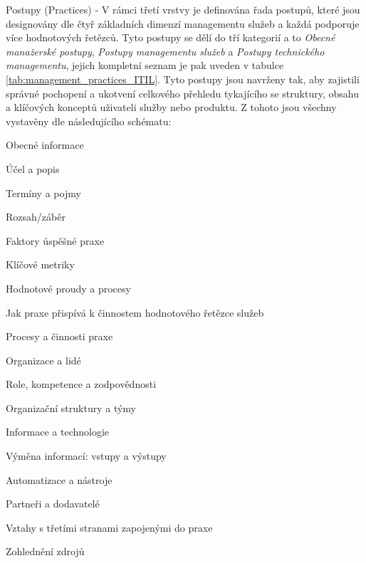 \documentclass[
  digital,     %
  twoside,     %
  lof,         %
  lot,         %
]{fithesis4}
\begin{document}
\begin{compactitem}
    \item Postupy (Practices) - V rámci třetí vrstvy je definována řada postupů, které jsou designovány dle čtyř základních dimenzí managementu služeb a každá podporuje více hodnotových řetězců. Tyto postupy se dělí do tří kategorií a to \emph{Obecné manažerské postupy}, \emph{Postupy managementu služeb} a \emph{Postupy technického managementu}, jejich kompletní seznam je pak uveden v tabulce \ref{tab:management_practices_ITIL}.
    Tyto postupy jsou navrženy tak, aby zajistili správné pochopení a ukotvení celkového přehledu tykajícího se struktury, obsahu a klíčových konceptů uživateli služby nebo produktu. Z tohoto jsou všechny vystavěny dle následujícího schématu: \parencite[s.~23]{Cartlidge2020}
    \begin{compactitem}
        \item Obecné informace
        \begin{compactitem}
            \item Účel a popis
            \item Termíny a pojmy
            \item Rozsah/záběr
            \item Faktory úspěšné praxe
            \item Klíčové metriky
        \end{compactitem}
        \item Hodnotové proudy a procesy
        \begin{compactitem}
            \item Jak praxe přispívá k činnostem hodnotového řetězce služeb
            \item Procesy a činnosti praxe
        \end{compactitem}
        \item Organizace a lidé
            \begin{compactitem}
                \item Role, kompetence a zodpovědnosti
                \item Organizační struktury a týmy
            \end{compactitem}
        \item Informace a technologie
        \begin{compactitem}
            \item Výměna informací: vstupy a výstupy
            \item Automatizace a nástroje
        \end{compactitem}
        \item Partneři a dodavatelé
        \begin{compactitem}
            \item Vztahy s třetími stranami zapojenými do praxe
            \item Zohlednění zdrojů
        \end{compactitem}
    \end{compactitem}


\end{compactitem}
\end{document}

